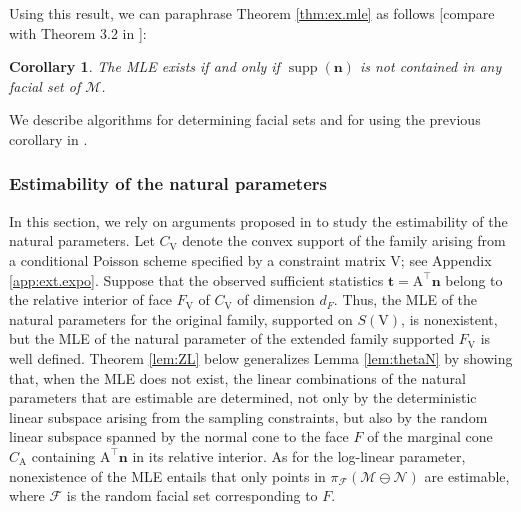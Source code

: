 \documentclass[aos,MSNbibl,nameyear,dvips]{arximspdf}
\newtheorem{corollary}[theorem]{Corollary}
\newcommand{\m}[1]{\mathrm{#1}}
\begin{document}
Using this result, we can paraphrase Theorem \ref{thm:ex.mle} as
follows [compare with Theorem 3.2 in \citet{HAB74}]:\vadjust{\goodbreak}

\begin{corollary}
The MLE exists if and only if $\operatorname{supp}(\mathbf{n})$ is not
contained in any facial set of $\mathcal{M}$.
\end{corollary}

We describe algorithms for determining facial sets and for using the
previous corollary in \citet{FRsupp}.

\subsubsection{Estimability of the natural parameters}\label{sec:est.cond.poiss}

In this section, we rely on arguments proposed in \citet{ERGM09} to
study the estimability of the natural parameters. Let $C_{\m{V}}$
denote the convex support of the family arising from a conditional
Poisson scheme specified by a constraint matrix $\m{V}$; see Appendix
\ref{app:ext.expo}. Suppose that the observed sufficient statistics
$\mathbf{t} = \m{A}^\top\mathbf{n}$ belong to the relative interior of
face $F_{\m{V}}$ of $C_{\m{V}}$ of dimension $d_F$. Thus, the MLE of
the natural parameters for the original family, supported on
$S(\m{V})$, is nonexistent, but the MLE of the natural parameter of the
extended family supported $F_{\m{V}}$ is well defined.
Theorem \ref{lem:ZL} below generalizes Lemma \ref{lem:thetaN} by
showing that, when the MLE does not exist, the linear combinations of
the natural parameters that are estimable are determined, not only by
the deterministic linear subspace arising from the sampling
constraints, but also by the random linear subspace spanned by the
normal cone to the face $F$ of the marginal cone $C_{\m{A}}$ containing
$\m{A}^\top\mathbf{n}$ in its relative interior. As for the log-linear
parameter, nonexistence of the MLE entails that only points in
$\pi_{\mathcal{F}}  ( \mathcal{M} \ominus\mathcal{N}   )$ are
estimable, where $\mathcal{F}$ is the random facial set corresponding
to $F$.
\end{document}
